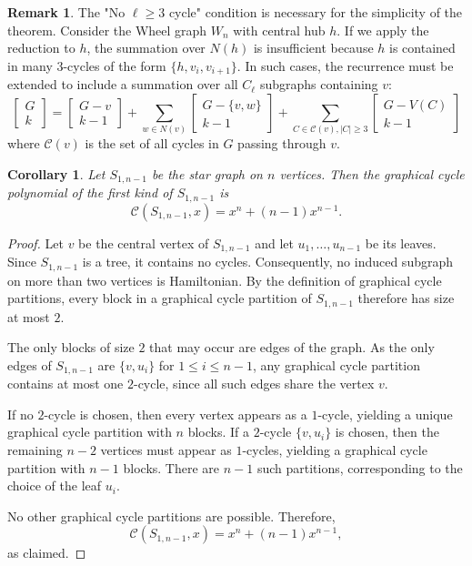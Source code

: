 \documentclass{amsart}
\newcounter{cases}
\newtheorem{corollary}[theorem]{Corollary}
\theoremstyle{definition}
\newtheorem{remark}[theorem]{Remark}
\def\st#1#2{\begin{bmatrix} #1 \\ #2 \end{bmatrix}}
\begin{document}
\begin{remark}
The "No $\ell \geq 3$ cycle" condition is necessary for the simplicity of the theorem. Consider the Wheel graph $W_n$ with central hub $h$. If we apply the reduction to $h$, the summation over $N(h)$ is insufficient because $h$ is contained in many 3-cycles of the form $\{h, v_i, v_{i+1}\}$. In such cases, the recurrence must be extended to include a summation over all $C_{\ell}$ subgraphs containing $v$:
\begin{equation*}
    \st{G}{k} = \st{G - v}{k - 1} + \sum_{w \in N(v)} \st{G - \{v,w\}}{k - 1} + \sum_{C \in \mathcal{C}(v), |C| \geq 3} \st{G - V(C)}{k-1}
\end{equation*}
where $\mathcal{C}(v)$ is the set of all cycles in $G$ passing through $v$.
\end{remark}\begin{corollary}\label{cor:star_cycle_polynomial}
Let $S_{1,n-1}$ be the star graph on $n$ vertices. Then the graphical cycle
polynomial of the first kind of $S_{1,n-1}$ is
\[
\mathcal{C}(S_{1,n-1},x)
=
x^{n} + (n-1)x^{n-1}.
\]
\end{corollary}

\begin{proof}
Let $v$ be the central vertex of $S_{1,n-1}$ and let
$u_1,\dots,u_{n-1}$ be its leaves. Since $S_{1,n-1}$ is a tree, it contains no
cycles. Consequently, no induced subgraph on more than two vertices is
Hamiltonian. By the definition of graphical cycle partitions, every block in a
graphical cycle partition of $S_{1,n-1}$ therefore has size at most $2$.

The only blocks of size $2$ that may occur are edges of the graph. As the only
edges of $S_{1,n-1}$ are $\{v,u_i\}$ for $1 \le i \le n-1$, any graphical cycle
partition contains at most one $2$-cycle, since all such edges share the vertex
$v$.

If no $2$-cycle is chosen, then every vertex appears as a $1$-cycle, yielding
a unique graphical cycle partition with $n$ blocks. If a $2$-cycle
$\{v,u_i\}$ is chosen, then the remaining $n-2$ vertices must appear as
$1$-cycles, yielding a graphical cycle partition with $n-1$ blocks. There are
$n-1$ such partitions, corresponding to the choice of the leaf $u_i$.

No other graphical cycle partitions are possible. Therefore,
\[
\mathcal{C}(S_{1,n-1},x)
=
x^{n} + (n-1)x^{n-1},
\]
as claimed.
\end{proof}
\end{document}
